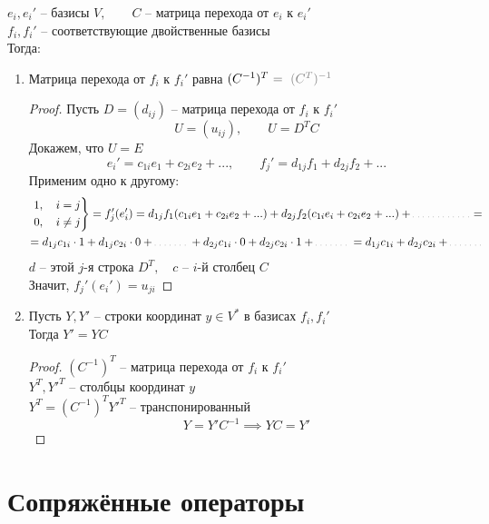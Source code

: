 \begin{theorem}
	$ e_i, e_i' $ -- базисы $ V, \qquad C $ -- матрица перехода от $ e_i $ к $ e_i' $ \\
	$ f_i, f_i' $ -- соответствующие двойственные базисы \\
	Тогда:
	\begin{enumerate}
		\item Матрица перехода от $ f_i $ к $ f_i' $ равна $ (C^{-1})^T \nimp[~ = ~ (C^T)^{-1}] $
		\begin{proof}
			Пусть $ D = (d_{ij}) $ -- матрица перехода от $ f_i $ к $ f_i' $
			$$ U = (u_{ij}), \qquad U = D^TC $$
			Докажем, что $ U = E $
			$$ e_i' = c_{1i}e_1 + c_{2i}e_2 + ..., \qquad f_j' = d_{1j}f_1 + d_{2j}f_2 + ... $$
			Применим одно к другому:
			\begin{multline*}
				\begin{rcases}
					1, \quad i = j \\
					0, \quad i \ne j
				\end{rcases} = f_j'(e_i') = d_{1j}f_1(c_{1i}e_1 + c_{2i}e_2 + ...) + d_{2j}f_2(c_{1i}e_i + c_{2i}e_2 + ...) + \widedots[5em] = \\
				= d_{1j}c_{1i} \cdot 1 + d_{1j}c_{2i} \cdot 0 + \widedots[3em] + d_{2j}c_{1i} \cdot 0 + d_{2j}c_{2i} \cdot 1 + \widedots[3em] = d_{1j}c_{1i} + d_{2j}c_{2i} + \widedots[3em]
			\end{multline*}
			$ d $ -- этой $ j $-я строка $ D^T, \quad c $ -- $ i $-й столбец $ C $ \\
			Значит, $ f_j'(e_i') = u_{ji} $
		\end{proof}
		\item Пусть $ Y, Y' $ -- строки координат $ y \in V^* $ в базисах $ f_i, f_i' $ \\
		Тогда $ Y' = YC $
		\begin{proof}
			$ (C^{-1})^T $ -- матрица перехода от $ f_i $ к $ f_i' $ \\
			$ Y^T, Y'^T $ -- столбцы координат $ y $ \\
			$ Y^T = (C^{-1})^TY'^T $ -- транспонированный
			$$ Y = Y'C^{-1} \implies YC = Y' $$
		\end{proof}
	\end{enumerate}
\end{theorem}

\section{Сопряжённые операторы}

